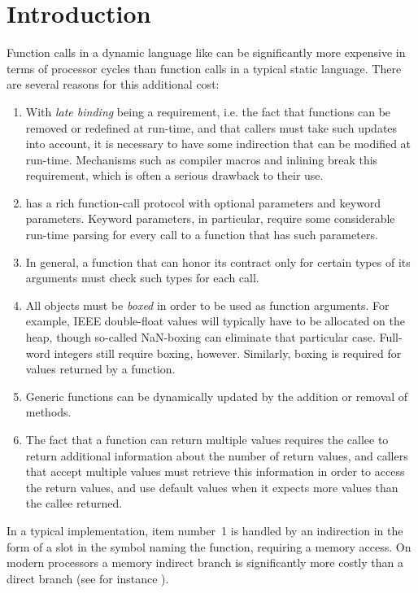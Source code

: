 \section{Introduction}
\label{sec-introduction}

Function calls in a dynamic language like \commonlisp{} can be
significantly more expensive in terms of processor cycles than
function calls in a typical static language.  There are several
reasons for this additional cost:

\begin{enumerate}
\item With \emph{late binding} being a requirement, i.e. the fact that
  functions can be removed or redefined at run-time, and that callers
  must take such updates into account, it is necessary to have some
  indirection that can be modified at run-time.  Mechanisms such as
  compiler macros and inlining break this requirement, which is often
  a serious drawback to their use.
\item \commonlisp{} has a rich function-call protocol with optional
  parameters and keyword parameters.  Keyword parameters, in
  particular, require some considerable run-time parsing for every
  call to a function that has such parameters.
\item In general, a function that can honor its contract only for
  certain types of its arguments must check such types for each call.
\item All objects must be \emph{boxed} in order to be used as function
  arguments.  For example, IEEE double-float values will typically
  have to be allocated on the heap, though so-called NaN-boxing
  \cite{Gudeman93representingtype} can eliminate that particular case.
  Full-word integers still require boxing, however.  Similarly, boxing
  is required for values returned by a function.
\item Generic functions can be dynamically updated by the addition or
  removal of methods.
\item The fact that a function can return multiple values requires the
  callee to return additional information about the number of
  return values, and callers that accept multiple values must retrieve
  this information in order to access the return values, and use
  default values when it expects more values than the callee
  returned.
\end{enumerate}

In a typical \commonlisp{} implementation, item number~1 is handled by
an indirection in the form of a slot in the symbol naming the
function, requiring a memory access.  On modern processors a memory
indirect branch is significantly more costly than a direct branch (see
for instance \cite{10.1145/2866573}).

